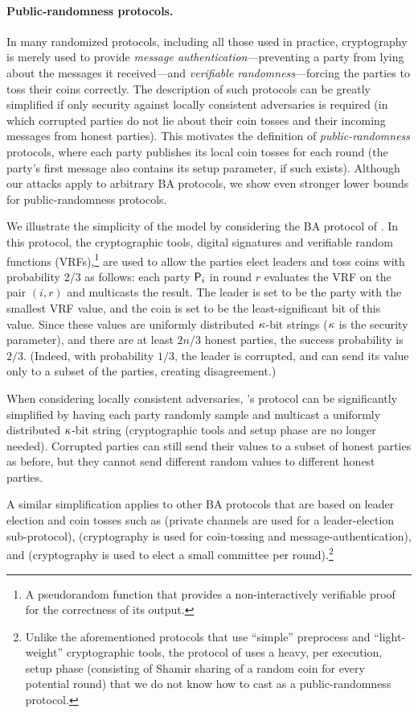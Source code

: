 \paragraph{Public-randomness protocols.}
In many randomized protocols, including all those used in practice, cryptography is merely used to provide \emph{message authentication}---preventing a party from lying about the messages it received---and \emph{verifiable randomness}---forcing the parties to toss their coins correctly. The description of such protocols can be greatly simplified if only security against locally consistent adversaries is required (in which corrupted parties do not lie about their coin tosses and their incoming messages from honest parties). This motivates the definition of \emph{public-randomness} protocols, where each party publishes its local coin tosses for each round (the party's first message also contains its setup parameter, if such exists).
Although our attacks apply to arbitrary BA protocols, we show even stronger lower bounds for public-randomness protocols.

We illustrate the simplicity of the model by considering the BA protocol of \citet{Micali17}. In this protocol, the cryptographic tools, digital signatures and verifiable random functions (VRFs),\footnote{A pseudorandom function that provides a non-interactively verifiable proof for the correctness of its output.} are used to allow the parties elect leaders and toss coins with probability $2/3$ as follows: each party $\mathsf{P}_i$ in round $r$ evaluates the VRF on the pair $(i,r)$ and multicasts the result. The leader is set to be the party with the smallest VRF value, and the coin is set to be the least-significant bit of this value. Since these values are uniformly distributed $\kappa$-bit strings ($\kappa$ is the security parameter), and there are at least $2n/3$ honest parties, the success probability is $2/3$. (Indeed, with probability $1/3$, the leader is corrupted, and can send its value only to a subset of the parties, creating disagreement.)

When considering locally consistent adversaries, \citeauthor{Micali17}'s protocol can be significantly simplified by having each party randomly sample and multicast a uniformly distributed $\kappa$-bit string (cryptographic tools and setup phase are no longer needed). Corrupted parties can still send their values to a subset of honest parties as before, but they cannot send different random values to different honest parties.

A similar simplification applies to other BA protocols that are based on leader election and coin tosses such as \cite{FM97,FG03,KK06} (private channels are used for a leader-election sub-protocol), \cite{MV17,ADDNR19} (cryptography is used for coin-tossing and message-authentication), and \cite{SM16,ACDNPRS19} (cryptography is used to elect a small committee per round).\footnote{Unlike the aforementioned protocols that use ``simple'' preprocess and ``light-weight'' cryptographic tools, the protocol of \citet{Rabin83} uses a heavy, per execution, setup phase (consisting of Shamir sharing of a random coin for every potential round) that we do not know how to cast as a public-randomness protocol.}


